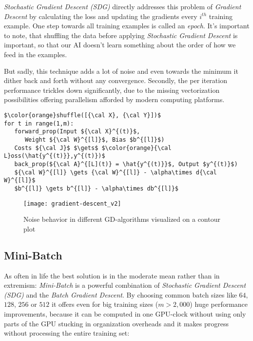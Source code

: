 \documentclass[dvipsnames,twocolumn]{scrartcl}
\begin{document}
	\emph{Stochastic Gradient Descent (SDG)} directly addresses this problem of \emph{Gradient Descent} by calculating the loss and updating the gradients every $i^{th}$ training example. One step towards all training examples is called an \emph{epoch}. It's important to note, that shuffling the data before applying \emph{Stochastic Gradient Descent} is important, so that our AI doesn't learn something about the order of how we feed in the examples.
	
	But sadly, this technique adds a lot of noise and even towards the minimum it dither back and forth without any convergence. Secondly, the per iteration performance trickles down significantly, due to the missing vectorization possibilities offering parallelism afforded by modern computing platforms.
	
	\begin{lstlisting}[frame=single,caption={Stocastic Gradient Descent Algorithm}]
$\color{orange}shuffle([{\cal X}, {\cal Y}])$
for t in range(1,m):
   forward_prop(Input ${\cal X}^{(t)}$,
      Weight ${\cal W}^{[l]}$, Bias $b^{[l]}$)
   Costs ${\cal J}$ $\gets$ $\color{orange}{\cal L}oss(\hat{y^{(t)}},y^{(t)})$
   back_prop(${\cal A}^{[L](t)} = \hat{y^{(t)}}$, Output $y^{(t)}$)
   ${\cal W}^{[l]} \gets {\cal W}^{[l]} - \alpha\times d{\cal W}^{[l]}$
   $b^{[l]} \gets b^{[l]} - \alpha\times db^{[l]}$
	\end{lstlisting}
	
	\begin{figure}
		\caption{Noise behavior in different GD-algorithms visualized on a contour plot}
		\texttt{[image: gradient-descent\_v2]}%
	\end{figure}
	
	\subsection{Mini-Batch}
	
	As often in life the best solution is in the moderate mean rather than in extremism: \emph{Mini-Batch} is a powerful combination of \emph{Stochastic Gradient Descent (SDG)} and the \emph{Batch Gradient Descent}. By choosing common batch sizes like $64$, $128$, $256$ or $512$ it offers even for big training sizes ($m > 2,000$) huge performance improvements, because it can be computed in one GPU-clock without using only parts of the GPU stucking in organization overheads and it makes progress without processing the entire training set:\\
	
\end{document}
